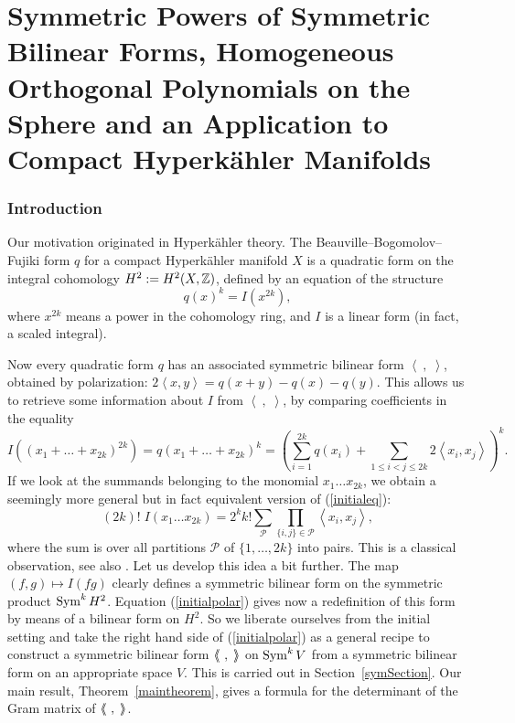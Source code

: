 
\renewcommand{\S}{\mathbb{S}}
\part{Symmetric Powers of Symmetric Bilinear Forms, Homogeneous Orthogonal Polynomials on the Sphere and an Application to Compact Hyperk\"ahler Manifolds}

\section{Introduction}
Our motivation originated in Hyperk\"ahler theory. The Beauville--Bogomolov--Fujiki form $q$ for a compact Hyperk\"ahler manifold $X$ is a quadratic form on the integral cohomology $H^2:=H^2(X,\mathbb{Z})$, defined by an equation of the structure
\begin{equation} \label{initialeq}
q(x)^k = I(x^{2k}),
\end{equation}
where $x^{2k}$ means a power in the cohomology ring, and $I$ is a linear form (in fact, a scaled integral). 

Now every quadratic form $q$ has an associated symmetric bilinear form $\left<\ ,\;\right>$, obtained by polarization: $2\left<x,y\right> = q(x+y)-q(x)-q(y)$. This allows us to retrieve some information about $I$ from $\left<\ ,\;\right>$,
by comparing coefficients in the equality
\begin{equation*}
I\!\left((x_1+\ldots+x_{2k})^{2k}\right) = q(x_1+\ldots+x_{2k})^{k} = \left(\sum\limits_{i=1}^{2k} q(x_i) +\!\!\!\sum\limits_{1\leq i<j\leq 2k}\!\!2 \left<x_i,x_j\right>  \right)^k.
\end{equation*}
If we look at the summands belonging to the monomial $x_1\ldots x_{2k}$, we obtain a seemingly more general but in fact equivalent version of (\ref{initialeq}):
\begin{equation} \label{initialpolar}
 (2k)!\; I\!\left(x_1\ldots x_{2k}\right) = 2^k k!\sum_{\mathcal{P}} \prod_{\{i,j\}\in\mathcal{P}}\left<x_i,x_j\right>,
\end{equation}
where the sum is over all partitions $\mathcal{P}$ of $\{1,\ldots,2k\}$ into pairs. This is a classical observation, see also \cite[Eq.~3.2.4]{OGrady}. Let us develop this idea a bit further. The map $(f,g) \mapsto I(fg)$ clearly defines a symmetric bilinear form on the symmetric product $\operatorname{Sym}^kH^2$.
Equation (\ref{initialpolar}) gives now a redefinition of this form by means of a bilinear form on $H^2$. So we liberate ourselves from the initial setting and take the right hand side of (\ref{initialpolar}) as a general recipe to construct a symmetric bilinear form $\bra\ ,\;\ket$ on $\operatorname{Sym}^kV$ from a symmetric bilinear form on an appropriate space $V$. This is carried out in Section~\ref{symSection}. Our main result, Theorem~\ref{maintheorem}, gives a formula for the determinant of the Gram matrix of $\bra\ ,\;\ket$. 

